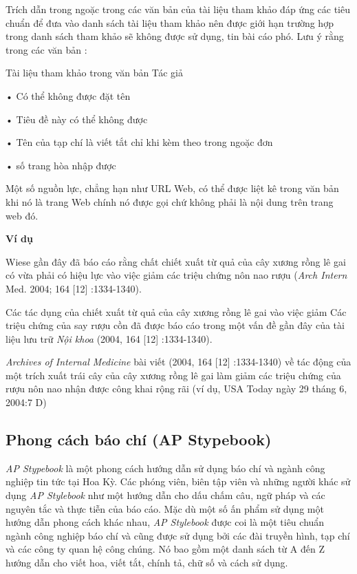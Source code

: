 \documentclass{hcmutarticle}
\begin{document}
Trích dẫn trong ngoặc trong các văn bản của tài liệu tham khảo đáp ứng các tiêu chuẩn để đưa vào danh sách tài liệu tham khảo nên được giới hạn trường hợp trong danh sách tham khảo sẽ không được sử dụng, tin bài cáo phó. Lưu ý rằng trong các văn bản :

Tài liệu tham khảo trong văn bản Tác giả 

• Có thể không được đặt tên 

• Tiêu đề này có thể không được 

• Tên của tạp chí là viết tắt chỉ khi kèm theo trong ngoặc đơn

 • số trang hòa nhập được 
 
Một số nguồn lực, chẳng hạn như URL Web, có thể được liệt kê trong văn bản khi nó là trang Web chính nó được gọi chứ không phải là nội dung trên trang web đó.

{\bfseries Ví dụ}

Wiese gần đây đã báo cáo rằng chất chiết xuất từ quả của cây xương rồng lê gai có vừa phải có hiệu lực vào việc giảm các triệu chứng nôn nao rượu ({\itshape Arch Intern} Med. 2004; 164 [12] :1334-1340). 

Các tác dụng của chiết xuất từ quả của cây xương rồng lê gai vào việc giảm Các triệu chứng của say rượu cồn đã được báo cáo trong một vấn đề gần đây của tài liệu lưu trữ {\itshape Nội khoa} (2004, 164 [12] :1334-1340). 

{\itshape Archives of Internal Medicine} bài viết (2004, 164 [12] :1334-1340) về tác động của một trích xuất trái cây của cây xương rồng lê gai làm giảm các triệu chứng của rượu nôn nao nhận được công khai rộng rãi (ví dụ, USA Today ngày 29 tháng 6, 2004:7 D)

\subsection{Phong cách báo chí (AP Stypebook)}

{\em AP Stypebook} là một phong cách hướng dẫn sử dụng báo chí và ngành công nghiệp tin tức tại Hoa Kỳ. Các phóng viên, biên tập viên và những người khác sử dụng {\em AP Stylebook} như một hướng dẫn cho dấu chấm câu, ngữ pháp và các nguyên tắc và thực tiễn của báo cáo. Mặc dù một số ấn phẩm sử dụng một hướng dẫn phong cách khác nhau, {\em AP Stylebook} được coi là một tiêu chuẩn ngành công nghiệp báo chí và cũng được sử dụng bởi các đài truyền hình, tạp chí và các công ty quan hệ công chúng. Nó bao gồm một danh sách từ A đến Z hướng dẫn cho viết hoa, viết tắt, chính tả, chữ số và cách sử dụng.
\end{document}
